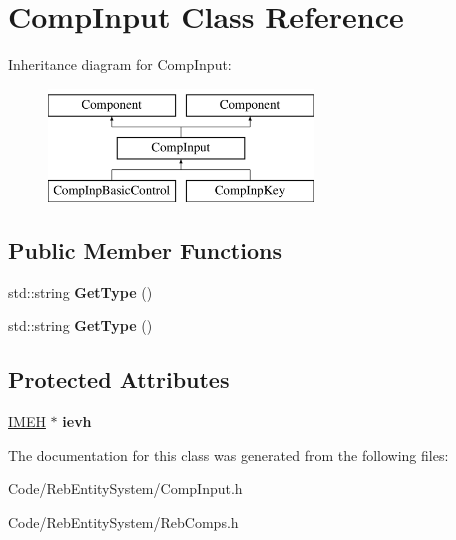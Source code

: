 \hypertarget{class_comp_input}{}\section{Comp\+Input Class Reference}
\label{class_comp_input}
Inheritance diagram for Comp\+Input\+:\begin{figure}[H]
\begin{center}
\leavevmode
\includegraphics[height=3.000000cm]{class_comp_input}
\end{center}
\end{figure}
\subsection*{Public Member Functions}
\begin{DoxyCompactItemize}
\item 
std\+::string {\bfseries Get\+Type} ()\hypertarget{class_comp_input_af1216a30f938795874dd9a38e6c89345}{}\label{class_comp_input_af1216a30f938795874dd9a38e6c89345}

\item 
std\+::string {\bfseries Get\+Type} ()\hypertarget{class_comp_input_af1216a30f938795874dd9a38e6c89345}{}\label{class_comp_input_af1216a30f938795874dd9a38e6c89345}

\end{DoxyCompactItemize}
\subsection*{Protected Attributes}
\begin{DoxyCompactItemize}
\item 
\hyperlink{class_i_m_e_h}{I\+M\+EH} $\ast$ {\bfseries ievh}\hypertarget{class_comp_input_a99f7be8e318fe4394a300d88c0184e6d}{}\label{class_comp_input_a99f7be8e318fe4394a300d88c0184e6d}

\end{DoxyCompactItemize}


The documentation for this class was generated from the following files\+:\begin{DoxyCompactItemize}
\item 
Code/\+Reb\+Entity\+System/Comp\+Input.\+h\item 
Code/\+Reb\+Entity\+System/Reb\+Comps.\+h\end{DoxyCompactItemize}

